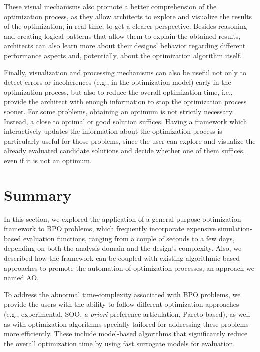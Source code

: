 These visual mechanisms also promote a better comprehension of the optimization process, as they allow architects to explore and visualize the results of the optimization, in real-time, to get a clearer perspective. Besides reasoning and creating logical patterns that allow them to explain the obtained results, architects can also learn more about their designs' behavior regarding different performance aspects and, potentially, about the optimization algorithm itself.

Finally, visualization and processing mechanisms can also be useful not only to detect errors or incoherences (e.g., in the optimization model) early in the optimization process, but also to reduce the overall optimization time, i.e.,  provide the architect with enough information to stop the optimization process sooner. For some problems, obtaining an optimum is not strictly necessary. Instead, a close to optimal or good solution suffices. Having a framework which interactively updates the information about the optimization process is particularly useful for those problems, since the user can explore and visualize the already evaluated candidate solutions and decide whether one of them suffices, even if it is not an optimum. 

\section{Summary}

In this section, we explored the application of a general purpose optimization framework to \ac{BPO} problems, which frequently incorporate expensive simulation-based evaluation functions, ranging from a couple of seconds to a few days, depending on both the analysis domain and the design's complexity. Also, we described how the framework can be coupled with existing algorithmic-based approaches to promote the automation of optimization processes, an approach we named \ac{AO}.

To address the abnormal time-complexity associated with \ac{BPO} problems, we provide the users with the ability to follow different optimization approaches (e.g., experimental, \ac{SOO}, \textit{a priori} preference articulation, Pareto-based), as well as with optimization algorithms specially tailored for addressing these problems more efficiently. These include model-based algorithms that significantly reduce the overall optimization time by using fast surrogate models for evaluation. %

